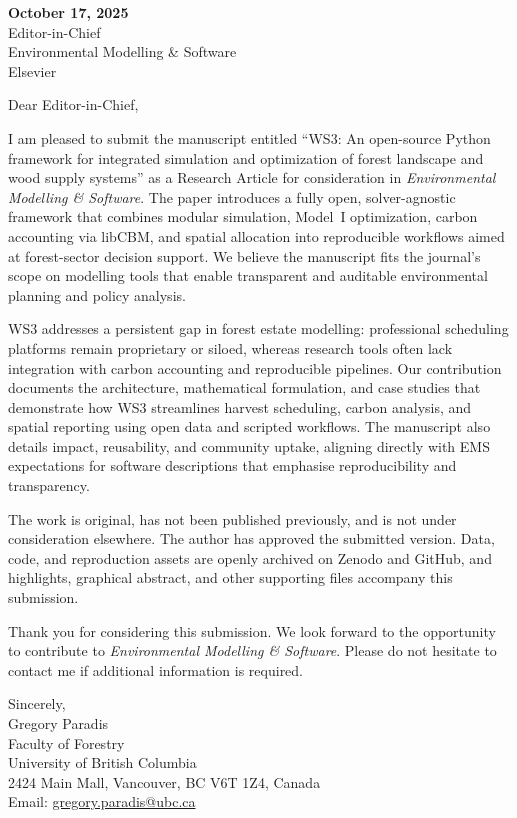 \documentclass[11pt]{article}
\begin{document}

\noindent\textbf{October 17, 2025} \\[1em]
\noindent Editor-in-Chief \\Environmental Modelling \& Software \\Elsevier

\bigskip

\noindent Dear Editor-in-Chief, 

\medskip

I am pleased to submit the manuscript entitled ``WS3: An open-source Python framework for integrated simulation and optimization of forest landscape and wood supply systems'' as a Research Article for consideration in \emph{Environmental Modelling \& Software}. The paper introduces a fully open, solver-agnostic framework that combines modular simulation, Model~I optimization, carbon accounting via libCBM, and spatial allocation into reproducible workflows aimed at forest-sector decision support. We believe the manuscript fits the journal's scope on modelling tools that enable transparent and auditable environmental planning and policy analysis.

WS3 addresses a persistent gap in forest estate modelling: professional scheduling platforms remain proprietary or siloed, whereas research tools often lack integration with carbon accounting and reproducible pipelines. Our contribution documents the architecture, mathematical formulation, and case studies that demonstrate how WS3 streamlines harvest scheduling, carbon analysis, and spatial reporting using open data and scripted workflows. The manuscript also details impact, reusability, and community uptake, aligning directly with EMS expectations for software descriptions that emphasise reproducibility and transparency.

The work is original, has not been published previously, and is not under consideration elsewhere. The author has approved the submitted version. Data, code, and reproduction assets are openly archived on Zenodo and GitHub, and highlights, graphical abstract, and other supporting files accompany this submission.

Thank you for considering this submission. We look forward to the opportunity to contribute to \emph{Environmental Modelling \& Software}. Please do not hesitate to contact me if additional information is required.

\bigskip

\noindent Sincerely, \\[0.75em]
\noindent Gregory Paradis \\Faculty of Forestry \\University of British Columbia \\2424 Main Mall, Vancouver, BC V6T 1Z4, Canada \\Email: \href{mailto:gregory.paradis@ubc.ca}{gregory.paradis@ubc.ca}
\end{document}
